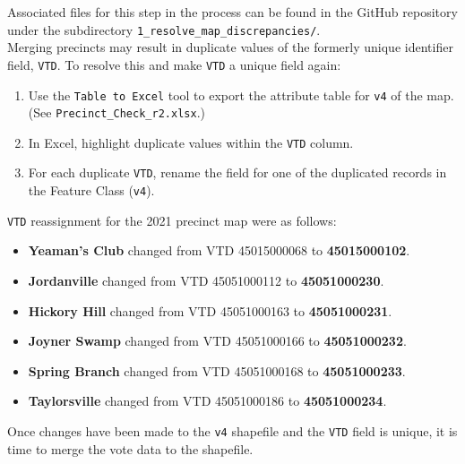 \documentclass[11pt]{article}
\begin{document}
Associated files for this step in the process can be found in the GitHub repository under the subdirectory \verb|1_resolve_map_discrepancies/|.\\

Merging precincts may result in duplicate values of the formerly unique identifier field, \verb|VTD|. To resolve this and make \verb|VTD| a unique field again:
\begin{enumerate}
	\item Use the \verb|Table to Excel| tool to export the attribute table for \verb|v4| of the map. \\
	(See \verb|Precinct_Check_r2.xlsx|.)
	\item In Excel, highlight duplicate values within the \verb|VTD| column. 
	\item For each duplicate \verb|VTD|, rename the field for one of the duplicated records in the Feature Class (\verb|v4|).
\end{enumerate}

\verb|VTD| reassignment for the 2021 precinct map were as follows:
\begin{itemize}
	\item \textbf{Yeaman’s Club} changed from VTD 45015000068 to \textbf{45015000102}.
	\item \textbf{Jordanville} changed from VTD 45051000112 to \textbf{45051000230}.
	\item \textbf{Hickory Hill} changed from VTD 45051000163 to \textbf{45051000231}.
	\item \textbf{Joyner Swamp} changed from VTD 45051000166 to \textbf{45051000232}.
	\item \textbf{Spring Branch} changed from VTD 45051000168 to \textbf{45051000233}.
	\item \textbf{Taylorsville} changed from VTD 45051000186 to \textbf{45051000234}.\\
	\end{itemize}

Once changes have been made to the \verb|v4| shapefile and the \verb|VTD| field is unique, it is time to merge the vote data to the shapefile.
\end{document}
